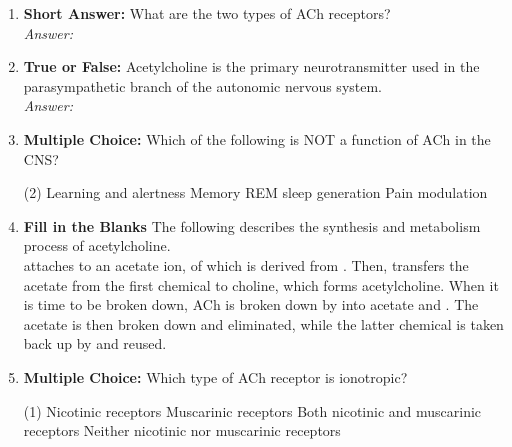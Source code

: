 \begin{enumerate}[label=\textbf{Q3.4.\arabic*}]
    \item \textbf{Short Answer:} What are the two types of ACh receptors? \\
        \textit{Answer:} \\%

    \item \textbf{True or False:} Acetylcholine is the primary neurotransmitter used in the parasympathetic branch of the autonomic nervous system. \\
        \textit{Answer:} %

    \item \textbf{Multiple Choice:} Which of the following is NOT a function of ACh in the CNS?
        \begin{tasks}[label=\textcolor{\documentTheme}{(\Alph*)}, item-format=\color{\documentTheme}, label-width=1.5em, item-indent=1.7em](2)
            \task Learning and alertness
            \task Memory
            \task REM sleep generation
            \task Pain modulation
        \end{tasks}

    \item \textbf{Fill in the Blanks} The following describes the synthesis and metabolism process of acetylcholine. \\
    \underline{\hspace{3cm}} attaches to an acetate ion, of which is derived from \underline{\hspace{3cm}}. Then, \underline{\hspace{4cm}} transfers the acetate from the first chemical to choline, which forms acetylcholine. When it is time to be broken down, ACh is broken down by \underline{\hspace{3cm}} into acetate and \underline{\hspace{3cm}}. The acetate is then broken down and eliminated, while the latter chemical is taken back up by \underline{\hspace{3cm}} and reused.

    \item \textbf{Multiple Choice:} Which type of ACh receptor is ionotropic?
        \begin{tasks}[label=\textcolor{\documentTheme}{(\Alph*)}, item-format=\color{\documentTheme}, label-width=1.5em, item-indent=1.7em](1)
            \task Nicotinic receptors
            \task Muscarinic receptors
            \task Both nicotinic and muscarinic receptors
            \task Neither nicotinic nor muscarinic receptors
        \end{tasks}


\end{enumerate}
